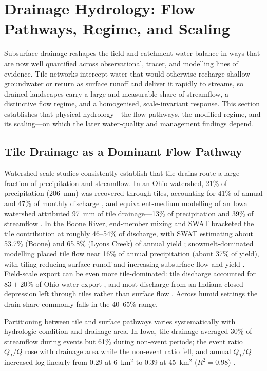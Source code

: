 \documentclass[11pt]{article}
\begin{document}
\section*{Drainage Hydrology: Flow Pathways, Regime, and Scaling}

Subsurface drainage reshapes the field and catchment water balance in ways that are now well quantified across observational, tracer, and modelling lines of evidence. Tile networks intercept water that would otherwise recharge shallow groundwater or return as surface runoff and deliver it rapidly to streams, so drained landscapes carry a large and measurable share of streamflow, a distinctive flow regime, and a homogenised, scale-invariant response. This section establishes that physical hydrology---the flow pathways, the modified regime, and its scaling---on which the later water-quality and management findings depend.

\subsection{Tile Drainage as a Dominant Flow Pathway}

Watershed-scale studies consistently establish that tile drains route a large fraction of precipitation and streamflow. In an Ohio watershed, 21\% of precipitation (206~mm) was recovered through tiles, accounting for 41\% of annual and 47\% of monthly discharge \parencite{King2014}, and equivalent-medium modelling of an Iowa watershed attributed 97~mm of tile drainage---13\% of precipitation and 39\% of streamflow \parencite{Thomas2016}. In the Boone River, end-member mixing and \textsc{SWAT} bracketed the tile contribution at roughly 46--54\% of discharge, with \textsc{SWAT} estimating about 53.7\% (Boone) and 65.8\% (Lyons Creek) of annual yield \parencite{Schilling2019}; snowmelt-dominated modelling placed tile flow near 16\% of annual precipitation (about 37\% of yield), with tiling reducing surface runoff and increasing subsurface flow and yield \parencite{Rahman2014}. Field-scale export can be even more tile-dominated: tile discharge accounted for $83\pm20$\% of Ohio water export \parencite{Williams2018}, and most discharge from an Indiana closed depression left through tiles rather than surface flow \parencite{Williams2019}. Across humid settings the drain share commonly falls in the 40--65\% range.

Partitioning between tile and surface pathways varies systematically with hydrologic condition and drainage area. In Iowa, tile drainage averaged 30\% of streamflow during events but 61\% during non-event periods; the event ratio $Q_T/Q$ rose with drainage area while the non-event ratio fell, and annual $Q_T/Q$ increased log-linearly from 0.29 at 6~km$^2$ to 0.39 at 45~km$^2$ ($R^2=0.98$) \parencite{Thomas2016,King2014}.
\end{document}
